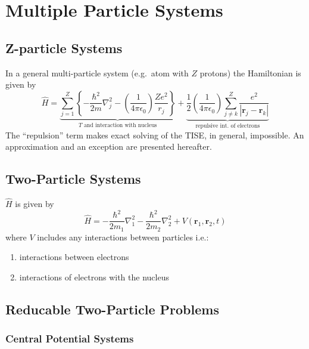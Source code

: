\section{Multiple Particle Systems}
\subsection{Z-particle Systems}
In a general multi-particle system (e.g.\ atom with $Z$ protons) the Hamiltonian is given by
    {\small     %
        \begin{equation*}
            \widehat{H}=\underbrace{\sum_{j=1}^{Z}\left\{-\frac{\hbar^{2}}{2m}\nabla_{j}^{2}-\left(\frac{1}{4\pi \epsilon_{0}}\right)\frac{Ze^{2}}{r_{j}}\right\}}_{T\text{ and interaction with nucleus}} + \underbrace{\frac{1}{2}\left(\frac{1}{4\pi \epsilon_{0}}\right)\sum_{j\neq k}^{Z}\frac{e^{2}}{\left|\mathbf{r}_{j}-\mathbf{r}_{k}\right|}}_{\text{repulsive int.\ of electrons}}
        \end{equation*}
    }
The ``repulsion'' term makes exact solving of the TISE, in general, impossible. An approximation and an exception are presented hereafter.

\subsection{Two-Particle Systems}
$\widehat{H}$ is given by
\begin{equation*}
    \widehat{H}=-\frac{\hbar^{2}}{2m_{1}}\nabla_{1}^{2}-\frac{\hbar^{2}}{2m_{2}}\nabla_{2}^{2}+V(\mathbf{r}_{1},\mathbf{r}_{2},t)
\end{equation*}
where $V$ includes any interactions between particles i.e.:
\begin{enumerate}
    \item interactions between  electrons
    \item interactions of electrons with the nucleus
\end{enumerate}

\subsection{Reducable Two-Particle Problems}
\subsubsection{Central Potential Systems}

